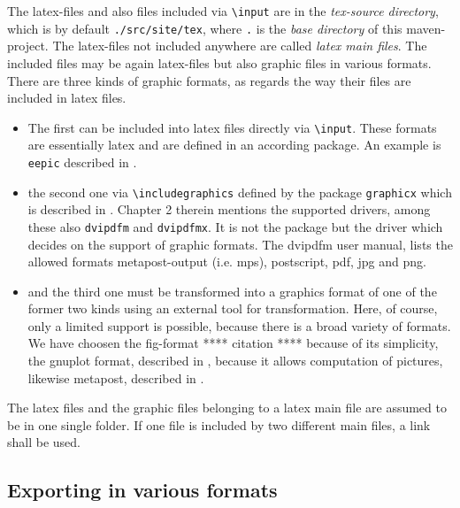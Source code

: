 \documentclass[12pt]{article}
\begin{document}
The latex-files and also files included via {\tt\textbackslash input} 
are in the {\em tex-source directory}, 
which is by default {\tt./src/site/tex}, 
where {\tt.} is the {\em base directory} of this maven-project. 
The latex-files not included anywhere are called {\em latex main files}. 
The included files may be again latex-files but also graphic files 
in various formats. 
There are three kinds of graphic formats, 
as regards the way their files are included in latex files. 
%
\begin{itemize}
\item
The first can be included into latex files directly 
via {\tt\textbackslash input}. 
These formats are essentially latex and are defined in an according package. 
An example is {\tt eepic} described in \cite{EEpic}. 
\item
the second one via {\tt\textbackslash includegraphics} 
defined by the package {\tt graphicx} 
which is described in \cite{GraX}. 
Chapter 2 therein mentions the supported drivers, 
among these also {\tt dvipdfm} and {\tt dvipdfmx}. 
It is not the package but the driver 
which decides on the support of graphic formats. 
The dvipdfm user manual, \cite{DviPdfMx} lists the allowed formats 
metapost-output (i.e. \gls{mps}), postscript, 
\gls{pdf}, \gls{jpg} and \gls{png}. 
\item
and the third one must be transformed into a graphics format 
of one of the former two kinds using an external tool for transformation. 
Here, of course, only a limited support is possible, 
because there is a broad variety of formats. 
We have choosen the \gls{fig}-format **** citation **** because of its simplicity, 
the gnuplot format, described in \cite{GnuPlot}, 
because it allows computation of pictures, 
likewise metapost, described in \cite{MPost}. 
\end{itemize}

The latex files and the graphic files belonging to a latex main file 
are assumed to be in one single folder. 
If one file is included by two different main files, 
a link shall be used. 


\subsection{Exporting in various formats}\label{sec:stableUsage}
\end{document}
